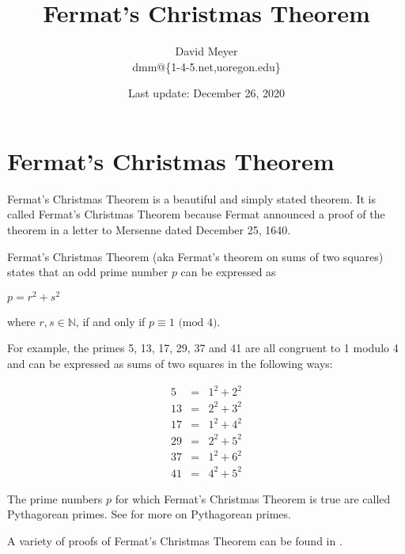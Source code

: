 \documentclass[11pt, oneside]{article}   	%
\title{Fermat's Christmas Theorem}
\author{David Meyer \\ dmm@\{1-4-5.net,uoregon.edu\}}
\date{Last update: December 26, 2020}
\theoremstyle{definition}
\begin{document}
\maketitle

\section*{Fermat's Christmas Theorem}

\noindent
Fermat's Christmas Theorem \cite{wiki:christmas_theorem} is a beautiful and simply stated theorem. It is called Fermat's Christmas Theorem because Fermat announced 
a proof of the theorem in a letter to Mersenne dated December 25, 1640. 

\bigskip
\noindent
Fermat's Christmas Theorem (aka Fermat's theorem on sums of two squares) states that an odd prime number $p$ can be expressed as

\bigskip
\begin{center}
\scalebox{2.00} {$p = r^{2} + s^{2}$}
\end{center}
\bigskip

\noindent
where $r,s \in \mathbb{N}$, if and only if $p \equiv 1 \textrm{ (mod  $4$)}$.

\bigskip
\noindent
For example, the primes 5, 13, 17, 29, 37 and 41 are all congruent to 1 modulo 4 and can be expressed as sums of two squares in the following ways:

\begin{equation*}
\begin{array}{rcll} 
5   &=& 1^{2} + 2^{2}   \\
13 &=& 2^{2} + 3^{2}   \\
17 &=&1^{2}  + 4^{2}    \\
29 &=& 2^{2} + 5^{2}    \\
37 &=& 1^{2} + 6^{2}    \\
41 &=& 4^{2} + 5^{2}
\end{array}
\end{equation*}

\bigskip
\noindent
The prime numbers $p$ for which Fermat's Christmas Theorem is true are called Pythagorean primes. See \cite{wiki:pythagorean_primes} for more on Pythagorean primes.


\bigskip
\noindent
A variety of proofs of Fermat's Christmas Theorem can be found in \cite{wiki:christmas_theorem_proofs}.




\end{document}
